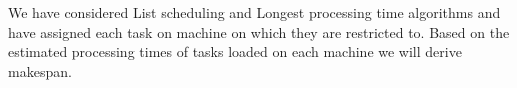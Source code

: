 \documentclass[10pt, conference, compsocconf]{IEEEtran}
\begin{document}
We have  considered List scheduling and Longest processing time algorithms and have  assigned each task on machine on which they are restricted to.   Based on the estimated processing times of  tasks loaded on each machine we will derive makespan. \\                                                                                                                                                                                                                                                                                                                                                                                                                                                                                                                                                                                                                                                                                                                                                                                                                                                                                                                                                                                                                                                                                                                                                                                                                                                                                                                                                                                                                                                                                                                                                                                                                                                                                                                                                                                                                                                                                                                                                                                                                                                                                                                                                                                                                                                                                                                                                                                                                                                                                                                                                                                                                                                                                                                                                                                                                                                                                                                                                                                                                                                                                                                                              
\end{document}
